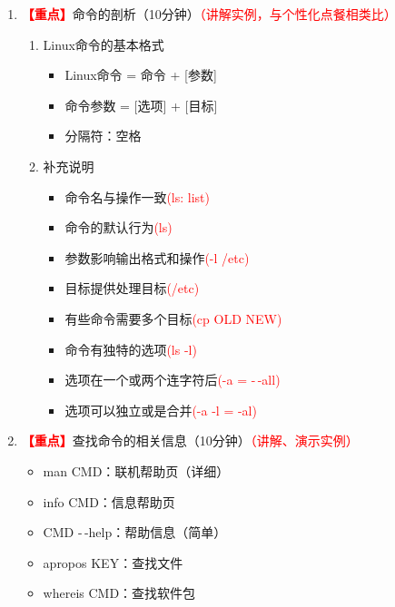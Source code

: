 \documentclass{TIJMUjiaoanLL}
\begin{document}
\begin{enumerate}
  \item \textcolor{red}{\textbf{【重点】}}命令的剖析（10分钟）\textcolor{red}{（讲解实例，与个性化点餐相类比）}
    \begin{enumerate}
      \item Linux命令的基本格式
	\begin{itemize}
	  \item Linux命令 = 命令 + [参数]
	  \item 命令参数 = [选项] + [目标]
	  \item 分隔符：空格
	\end{itemize}
      \item 补充说明
	\vspace*{-10pt}
	\begin{multicols}{2}
	\begin{itemize}
	  \item 命令名与操作一致\textcolor{red}{(ls: list)}
	  \item 命令的默认行为\textcolor{red}{(ls)}
	  \item 参数影响输出格式和操作\textcolor{red}{(-l /etc)}
	  \item 目标提供处理目标\textcolor{red}{(/etc)}
	  \item 有些命令需要多个目标\textcolor{red}{(cp OLD NEW)}
	  \item 命令有独特的选项\textcolor{red}{(ls -l)}
	  \item 选项在一个或两个连字符后\textcolor{red}{(-a = -\,-all)}
	  \item 选项可以独立或是合并\textcolor{red}{(-a -l = -al)}
	\end{itemize}
      \end{multicols}
	\vspace*{-10pt}
    \end{enumerate}

  \item \textcolor{red}{\textbf{【重点】}}查找命令的相关信息（10分钟）\textcolor{red}{（讲解、演示实例）}
      \begin{itemize}
	\item man CMD：联机帮助页（详细）
	\item info CMD：信息帮助页
	\item CMD -\,-help：帮助信息（简单）
	\item apropos KEY：查找文件
	\item whereis CMD：查找软件包
      \end{itemize}


\end{enumerate}
\end{document}
